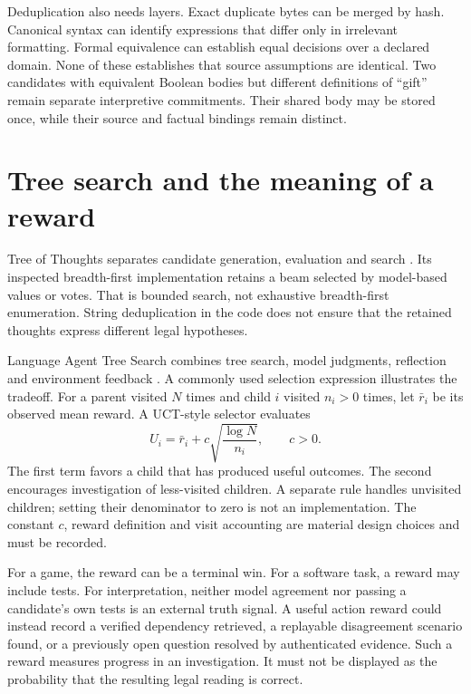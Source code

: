 \documentclass[12pt,a4paper,oneside,openany]{book}
\begin{document}
Deduplication also needs layers. Exact duplicate bytes can be merged by hash.
Canonical syntax can identify expressions that differ only in irrelevant
formatting. Formal equivalence can establish equal decisions over a declared
domain. None of these establishes that source assumptions are identical. Two
candidates with equivalent Boolean bodies but different definitions of ``gift''
remain separate interpretive commitments. Their shared body may be stored once,
while their source and factual bindings remain distinct.

\section{Tree search and the meaning of a reward}
\label{merge:M05:07}


Tree of Thoughts separates candidate generation, evaluation and search
\citep[section 3]{treeofthoughts2023}. Its inspected breadth-first implementation
retains a beam selected by model-based values or votes. That is bounded search,
not exhaustive breadth-first enumeration. String deduplication in the code does
not ensure that the retained thoughts express different legal hypotheses.

Language Agent Tree Search combines tree search, model judgments, reflection and
environment feedback \citep[sections 3.2--4 and appendix A]{lats2024}. A commonly
used selection expression illustrates the tradeoff. For a parent visited $N$
times and child $i$ visited $n_i>0$ times, let $\bar r_i$ be its observed mean
reward. A UCT-style selector evaluates
\begin{equation}
 U_i=\bar r_i+c\sqrt{\frac{\log N}{n_i}},\qquad c>0.
 \label{eq:uct}
\end{equation}
The first term favors a child that has produced useful outcomes. The second
encourages investigation of less-visited children. A separate rule handles
unvisited children; setting their denominator to zero is not an implementation.
The constant $c$, reward definition and visit accounting are material design
choices and must be recorded.

For a game, the reward can be a terminal win. For a software task, a reward may
include tests. For interpretation, neither model agreement nor passing a
candidate's own tests is an external truth signal. A useful action reward could
instead record a verified dependency retrieved, a replayable disagreement
scenario found, or a previously open question resolved by authenticated evidence.
Such a reward measures progress in an investigation. It must not be displayed as
the probability that the resulting legal reading is correct.
\end{document}

